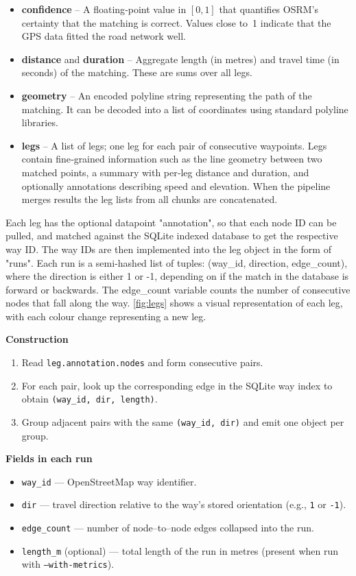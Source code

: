 \documentclass[11pt,a4paper]{article}
\begin{document}
\begin{itemize}
	\item \textbf{confidence} – A floating‑point value in \([0,1]\) that quantifies OSRM’s certainty that the matching is correct.  Values close to~1 indicate that the GPS data fitted the road network well.
	\item \textbf{distance} and \textbf{duration} – Aggregate length (in metres) and travel time (in seconds) of the matching.  These are sums over all legs.
	\item \textbf{geometry} – An encoded polyline string representing the path of the matching.  It can be decoded into a list of coordinates using standard polyline libraries.
	\item \textbf{legs} – A list of legs; one leg for each pair of consecutive waypoints.  Legs contain fine‑grained information such as the line geometry between two matched points, a summary with per‑leg distance and duration, and optionally annotations describing speed and elevation.  When the pipeline merges results the leg lists from all chunks are concatenated.
\end{itemize}
Each leg has the optional datapoint "annotation", so that each node ID can be pulled, and matched against the SQLite indexed database\citep{sqlite} to get the respective way ID. The way IDs are then implemented into the leg object in the form of "runs". Each run is a semi-hashed list of tuples: (way\_id, direction, edge\_count), where the direction is either 1 or -1, depending on if the match in the database is forward or backwards. The edge\_count variable counts the number of consecutive nodes that fall along the way.
\ref{fig:legs} shows a visual representation of each leg, with each colour change representing a new leg.

\noindent\textbf{Construction}
\begin{enumerate}
	\item Read \texttt{leg.annotation.nodes} and form consecutive pairs.
	\item For each pair, look up the corresponding edge in the SQLite way index\citep{sqlite} to obtain \texttt{(way\_id, dir, length)}.
	\item Group adjacent pairs with the same \texttt{(way\_id, dir)} and emit one object per group.
\end{enumerate}

\noindent\textbf{Fields in each run}
\begin{itemize}
	\item \texttt{way\_id} — OpenStreetMap way identifier.
	\item \texttt{dir} — travel direction relative to the way’s stored orientation (e.g., \texttt{1} or \texttt{-1}).
	\item \texttt{edge\_count} — number of node–to–node edges collapsed into the run.
	\item \texttt{length\_m} (optional) — total length of the run in metres (present when run with \texttt{--with-metrics}).
\end{itemize}
\end{document}
